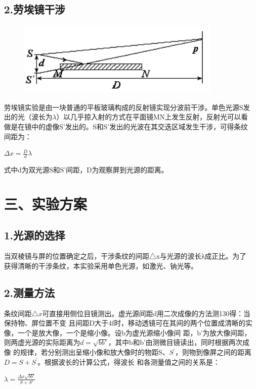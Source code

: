 \documentclass[11pt,a4paper,oneside]{article}
\begin{document}
\subsection*{2.劳埃镜干涉}

\begin{figure}[htbp]
 \centering
  \includegraphics[width=10cm]{laoai.png}
\end{figure}

劳埃镜实验是由一块普通的平板玻璃构成的反射镜实现分波前干涉。单色光源S发出的光（波长为$\lambda$）以几乎掠入射的方式在平面镜MN上发生反射，反射光可以看做是在镜中的虚像S’发出的。S和S’发出的光波在其交迭区域发生干涉，可得条纹间距为：

\begin{center}
$\Delta x=\displaystyle\frac{D}{d}\lambda$
\end{center}
   
式中d为双光源S和S’间距，D为观察屏到光源的距离。

\section*{三、实验方案}

\subsection*{1.光源的选择} 
 当双棱镜与屏的位置确定之后，干涉条纹的间距△x与光源的波长λ成正比。为了获得清晰的干涉条纹，本实验采用单色光源，如激光、钠光等。

\subsection*{2.测量方法}
 条纹间距${\bigtriangleup}{x}$可直接用侧位目镜测出。虚光源间距d用二次成像的方法测130得：当保持物、屏位置不变
 且间距D大于4f时，移动透镜可在其间的两个位置成清晰的实像，一个是放大像，一个是缩小像。设b为虚光源缩小像间
 距，b’为放大像间距，则两虚光源的实际距离为$d=\sqrt{b{b}'}$，其中b和b’由测微目镜读出，同时根据两次成像
 的规律，若分别测出呈缩小像和放大像时的物距S、$S^’$，则物到像屏之间的距离$D=S+S^’$。根据波长的计算公式，得波长
 和各测量值之间的关系是：
 \begin{center}
 $\lambda =\displaystyle\frac{\Delta x\sqrt{b{b}'}}{S+{S}'}$\\
 \end{center}
 
\end{document}
